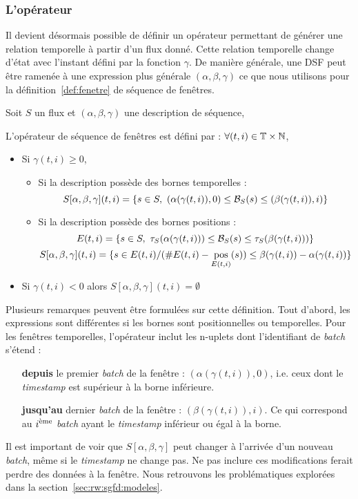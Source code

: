 \subsubsection{L'opérateur}
Il devient désormais possible de définir un opérateur permettant de générer une relation temporelle à partir d'un flux donné. Cette relation temporelle change d'état avec l'instant défini par la fonction $\gamma$. De manière générale, une DSF peut être ramenée à une expression plus générale $(\alpha,\beta,\gamma)$ ce que nous utilisons pour la définition~\ref{def:fenetre} de séquence de fenêtres.
\begin{defi}\label{def:fenetre}
	Soit $S$ un flux et $(\alpha, \beta, \gamma)$ une description de séquence,
	
	L'opérateur de séquence de fenêtres est défini par : $\forall (t,i)\in \mathbb{T}\times\mathbb{N}$, 
	\begin{itemize}
		\item Si $\gamma(t,i) \geq 0$, 
		\begin{itemize}
			\item Si la description possède des bornes temporelles :
			$$S[\alpha,\beta,\gamma](t,i) = \left\{s\in S, \ (\alpha(\gamma(t,i)),0)\leq \BS(s) \leq (\beta(\gamma(t,i)),i)\right\}$$
			\item Si la description possède des bornes positions :
			$$E(t,i) = \left\{s\in S, \ \tau_S(\alpha(\gamma(t,i)))\leq \BS(s) \leq \tau_S(\beta(\gamma(t,i)))\right\}$$
			$$S[\alpha,\beta,\gamma](t,i) = \{s \in E(t,i) / (\#E(t,i) - \mathop{\mathrm{pos}}_{E(t,i)}(s)) \leq \beta(\gamma(t,i)) - \alpha(\gamma(t,i))\}$$
		\end{itemize}
		\item Si $\gamma(t,i) <0$ alors $S[\alpha,\beta,\gamma](t,i) = \emptyset$
	\end{itemize}
\end{defi}

Plusieurs remarques peuvent être formulées sur cette définition. Tout d'abord, les expressions sont différentes si les bornes sont positionnelles ou temporelles. Pour les fenêtres temporelles, l'opérateur inclut les n-uplets dont l'identifiant de \textit{batch} s'étend :
\begin{itemize}
	\item[\textbf{depuis}] le premier \textit{batch} de la fenêtre : $(\alpha(\gamma(t,i)),0)$, i.e. ceux dont le \textit{timestamp} est supérieur à la borne inférieure.
	\item[\textbf{jusqu'au}] dernier \textit{batch} de la fenêtre : $(\beta(\gamma(t,i)),i)$. Ce qui correspond au $i^{\textrm{\`{e}me}}$ \textit{batch} ayant le \textit{timestamp} inférieur ou égal à la borne.
\end{itemize}
Il est important de voir que $S[\alpha,\beta,\gamma]$ peut changer à l'arrivée d'un nouveau \textit{batch}, même si le \textit{timestamp} ne change pas. Ne pas inclure ces modifications ferait perdre des données à la fenêtre. Nous retrouvons les problématiques explorées dans la section~\ref{sec:rw:sgfd:modeles}.


